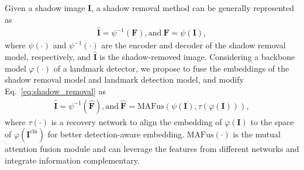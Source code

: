 \documentclass[10pt,twocolumn,letterpaper]{article}
\newcommand{\reqref}[1]{Eq.~\eqref{#1}}
\begin{document}
Given a shadow image $\mathbf{I}$, a shadow removal method can be generally represented as 
%
\begin{align}\label{eq:shadow_removal}
\hat{\mathbf{I}} = \psi^{-1}(\mathbf{F}), \text{and}~\mathbf{F} = \psi(\mathbf{I}),
\end{align}
where $\psi(\cdot)$ and $\psi^{-1}(\cdot)$ are the encoder and decoder of the shadow removal model, respectively, and $\hat{\mathbf{I}}$ is the shadow-removed image.
%
Considering a backbone model $\varphi(\cdot)$ of a landmark detector, we propose to fuse the embeddings of the shadow removal model and landmark detection model, and modify \reqref{eq:shadow_removal} as
%
\begin{align}\label{eq:shadow_removal_new}
\hat{\mathbf{I}} = \psi^{-1}(\hat{\mathbf{F}}), \text{and}~\hat{\mathbf{F}} = \text{MAFus}(\psi(\mathbf{I}),\tau(\varphi(\mathbf{I}))),
\end{align}
where $\tau(\cdot)$ is a recovery network to align the embedding of $\varphi(\mathbf{I})$
to the space of $\varphi(\mathbf{I}^\text{cln})$ for better detection-aware embedding. $\text{MAFus}(\cdot)$ is the mutual attention fusion module and can leverage the features from different networks and integrate information complementary.
\end{document}
